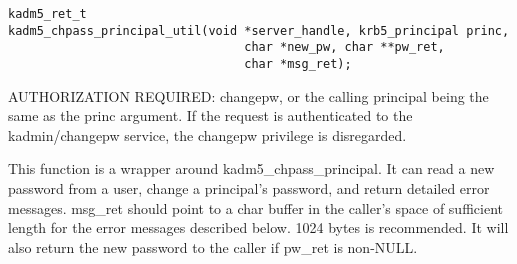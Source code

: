 \begin{verbatim}
kadm5_ret_t
kadm5_chpass_principal_util(void *server_handle, krb5_principal princ,
                                 char *new_pw, char **pw_ret,
                                 char *msg_ret);
\end{verbatim}

AUTHORIZATION REQUIRED: changepw, or the calling principal being the
same as the princ argument.  If the request is authenticated to the
kadmin/changepw service, the changepw privilege is disregarded.

This function is a wrapper around kadm5_chpass_principal. It can
read a new password from a user, change a principal's password, and
return detailed error messages.  msg_ret should point to a char buffer
in the caller's space of sufficient length for the error messages
described below. 1024 bytes is recommended.  It will also return the
new password to the caller if pw_ret is non-NULL.

